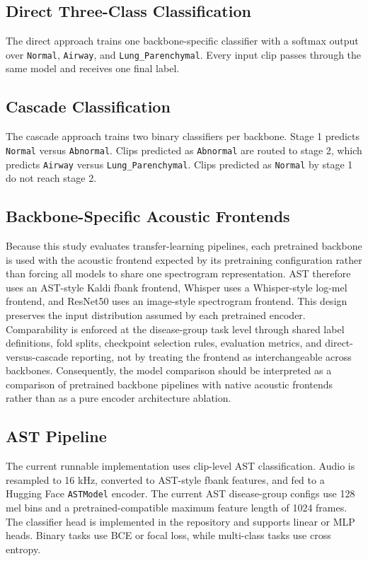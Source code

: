 \documentclass[11pt]{article}
\begin{document}
\subsection{Direct Three-Class Classification}

The direct approach trains one backbone-specific classifier with a softmax
output over \texttt{Normal}, \texttt{Airway}, and
\texttt{Lung\_Parenchymal}. Every input clip passes through the same model and
receives one final label.

\subsection{Cascade Classification}

The cascade approach trains two binary classifiers per backbone. Stage 1 predicts
\texttt{Normal} versus \texttt{Abnormal}. Clips predicted as
\texttt{Abnormal} are routed to stage 2, which predicts \texttt{Airway} versus
\texttt{Lung\_Parenchymal}. Clips predicted as \texttt{Normal} by stage 1 do
not reach stage 2.

\subsection{Backbone-Specific Acoustic Frontends}

Because this study evaluates transfer-learning pipelines, each pretrained
backbone is used with the acoustic frontend expected by its pretraining
configuration rather than forcing all models to share one spectrogram
representation. AST therefore uses an AST-style Kaldi fbank frontend, Whisper
uses a Whisper-style log-mel frontend, and ResNet50 uses an image-style
spectrogram frontend. This design preserves the input distribution assumed by
each pretrained encoder. Comparability is enforced at the disease-group task
level through shared label definitions, fold splits, checkpoint selection
rules, evaluation metrics, and direct-versus-cascade reporting, not by treating
the frontend as interchangeable across backbones. Consequently, the model
comparison should be interpreted as a comparison of pretrained backbone
pipelines with native acoustic frontends rather than as a pure encoder
architecture ablation.

\subsection{AST Pipeline}

The current runnable implementation uses clip-level AST classification. Audio
is resampled to 16 kHz, converted to AST-style fbank features, and fed to a
Hugging Face \texttt{ASTModel} encoder. The current AST disease-group configs
use 128 mel bins and a pretrained-compatible maximum feature length of 1024
frames. The classifier head is implemented in the repository and supports
linear or MLP heads. Binary tasks use BCE or focal loss, while multi-class
tasks use cross entropy.
\end{document}
